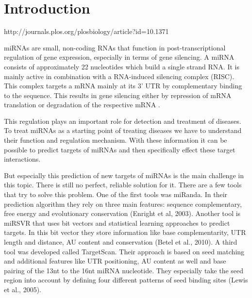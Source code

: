 \documentclass[12pt]{article}
\begin{document}
\tableofcontents

\newpage 
{}







\section{Introduction}

http://journals.plos.org/plosbiology/article?id=10.1371%


miRNAs are small, non-coding RNAs that function in post-transcriptional regulation of gene expression, especially in terms of gene silencing. A miRNA consists of approximately 22 nucleotides which build a single strand RNA. It is mainly active in combination with a RNA-induced silencing complex (RISC). This complex targets a mRNA mainly at its 3' UTR by complementary binding to the sequence. This results in gene silencing either by repression of mRNA translation or degradation of the respective mRNA \cite{Enright}. 

This regulation plays an important role for detection and treatment of diseases. To treat miRNAs as a starting point of treating diseases we have to understand their function and regulation mechanism. With these information it can be possible to predict targets of miRNAs and then specifically effect these target interactions. 

But especially this prediction of new targets of miRNAs is the main challenge in this topic. There is still no perfect, reliable solution for it. There are a few tools that try to solve this problem. One of the first tools was miRanda. In their prediction algorithm they rely on three main features: sequence complementary, free energy and evolutionary conservation (Enright et al, 2003). Another tool is miRSVR that uses bit vectors and statistical learning approaches to predict targets. In this bit vector they store information like base complementarity, UTR length and distance, AU content and conservation (Betel et al., 2010). A third tool was developed called TargetScan. Their approach is based on seed matching and additional features like UTR positioning, AU content as well and base pairing of the 13nt to the 16nt miRNA nucleotide. They especially take the seed region into account by defining four different patterns of seed binding sites (Lewis et al., 2005).
\end{document}

